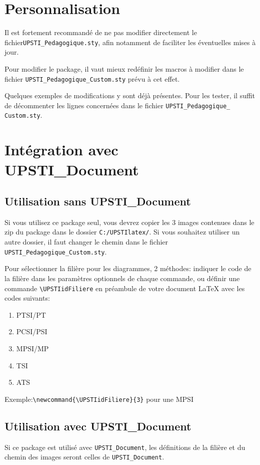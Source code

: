 \documentclass[11pt]{ltxdockit}[2010/09/26]
\newcommand{\ex}{\noindent Exemple:\quad}
\begin{document}
\section{Personnalisation}
Il est fortement recommandé de ne pas modifier directement le fichier\linebreak \texttt{UPSTI\_Pedagogique.sty}, afin notamment de faciliter les éventuelles mises à jour.

Pour modifier le package, il vaut mieux redéfinir les macros à modifier dans le fichier \texttt{UPSTI\_Pedagogique\_Custom.sty} prévu à cet effet. 

Quelques exemples de modifications y sont déjà présentes. Pour les tester, il suffit de décommenter les lignes concernées dans le fichier \texttt{UPSTI\_Pedagogique\_ \linebreak Custom.sty}.


\section{Intégration avec UPSTI\_Document}
\subsection{Utilisation sans UPSTI\_Document}
Si vous utilisez ce package seul, vous devrez copier les 3 images contenues dans le zip du package dans le dossier \texttt{C:/UPSTIlatex/}. Si vous souhaitez utiliser un autre dossier, il faut changer le chemin dans le fichier \texttt{UPSTI\_Pedagogique\_Custom.sty}.

Pour sélectionner la filière pour les diagrammes, 2 méthodes: indiquer le code de la filière dans les paramètres optionnels de chaque commande, ou définir une commande \verb!\UPSTIidFiliere! en préambule de votre document \LaTeX{} avec les codes suivants:
\begin{enumerate}
\item PTSI/PT
\item PCSI/PSI  
\item MPSI/MP 
\item TSI
\item ATS 
\end{enumerate}

\vspace{1em}
\ex\verb!\newcommand{\UPSTIidFiliere}{3}! pour une MPSI


\subsection{Utilisation avec UPSTI\_Document}
Si ce package est utilisé avec \texttt{UPSTI\_Document}, les définitions de la filière et du chemin des images seront celles de \texttt{UPSTI\_Document}. 
\end{document}
